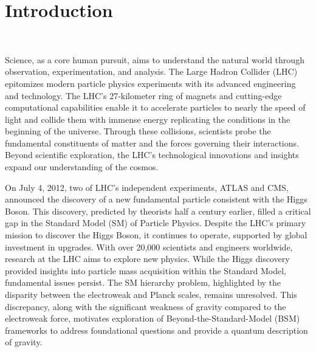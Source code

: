 \chapter{Introduction}~\label{ch:intro}

Science, as a core human pursuit, aims to understand the natural world through observation, experimentation, and analysis. The Large Hadron Collider (LHC)~\cite{Evans:2008zzb} epitomizes modern particle physics experiments with its advanced engineering and technology. The LHC's 27-kilometer ring of magnets and cutting-edge computational capabilities enable it to accelerate particles to nearly the speed of light and collide them with immense energy replicating the conditions in the beginning of the universe. Through these collisions, scientists probe the fundamental constituents of matter and the forces governing their interactions. Beyond scientific exploration, the LHC's technological innovations and insights expand our understanding of the cosmos.

On July 4, 2012, two of LHC's independent experiments, ATLAS and CMS, announced the discovery of a new fundamental particle consistent with the Higgs Boson. This discovery, predicted by theorists half a century earlier, filled a critical gap in the Standard Model (SM) of Particle Physics. Despite the LHC's primary mission to discover the Higgs Boson, it continues to operate, supported by global investment in upgrades. With over 20,000 scientists and engineers worldwide, research at the LHC aims to explore new physics. While the Higgs discovery provided insights into particle mass acquisition within the Standard Model, fundamental issues persist. The SM hierarchy problem, highlighted by the disparity between the electroweak and Planck scales, remains unresolved. This discrepancy, along with the significant weakness of gravity compared to the electroweak force, motivates exploration of Beyond-the-Standard-Model (BSM) frameworks to address foundational questions and provide a quantum description of gravity.



